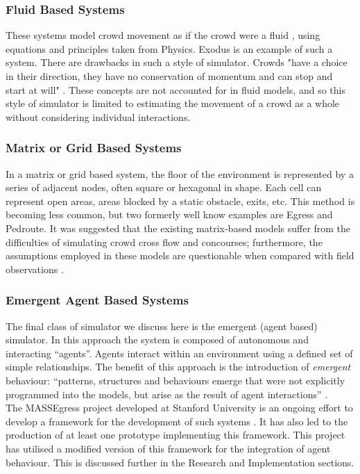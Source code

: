 \documentclass[a4paper,10pt]{article}
\begin{document}
\subsubsection{Fluid Based Systems}
These systems model crowd movement as if the crowd were a fluid \cite{WikipediaFluidMechanics}, using equations and principles taken from Physics. 
Exodus \cite{GaleaNumericalSimulation,GaleaMathModelling} is an example of such a system. There are drawbacks in such a style 
of simulator. Crowds "have a choice in their direction, they have no conservation of momentum and can stop and start at will" \cite{StillCrowdDynamics}. 
These concepts are not accounted for in fluid models, and so this style of simulator is limited to estimating the movement of a crowd as a whole without
considering individual interactions.

\subsubsection{Matrix or Grid Based Systems}
In a matrix or grid based system, the floor of the environment is represented by a series of adjacent nodes, often square or hexagonal in shape. Each 
cell can represent open areas, areas blocked by a static obstacle, exits, etc. This method is becoming less common, but two formerly well know examples are 
Egress and Pedroute. It was suggested that the existing matrix-based models suffer from the
difficulties of simulating crowd cross flow and concourses; furthermore, the
assumptions employed in these models are questionable when compared with field observations \cite{StillCrowdDynamics}.

\subsubsection{Emergent Agent Based Systems}
The final class of simulator we discuss here is the emergent (agent based) simulator. In this approach the system is composed of autonomous
and interacting ``agents''. Agents interact within an environment using a defined set of simple relationships. The benefit of this approach is the introduction
of \emph{emergent} behaviour: ``patterns, structures and behaviours emerge that were not explicitly programmed into the models, but arise as the 
result of agent interactions'' \cite{AgentBasedTutorial}.\\
The MASSEgress project developed at Stanford University is an ongoing effort to develop a framework for the development of such systems \cite{MultiAgentFramework}.
It has also led to the production of at least one prototype implementing this framework. 
This project has utilised a modified version of this framework for the integration
of agent behaviour. This is discussed further in the Research and Implementation sections.
\end{document}
